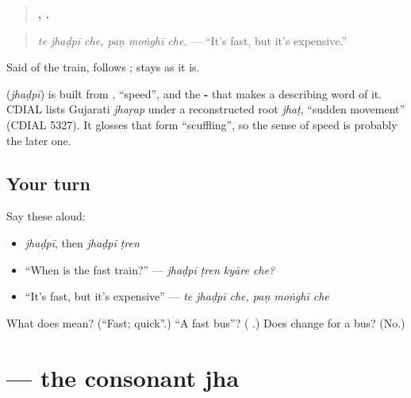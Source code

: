 \begin{quote}
\textbf{  ,   .}
\end{quote}

\begin{quote}
\emph{te jhaḍpī che, paṇ moṅghī che.} — \textquotedblleft{}It's fast, but it's expensive.\textquotedblright{}
\end{quote}

Said of the train, \textbf{} follows \textbf{}; \textbf{} stays as it is.

\begin{cousinweb}
\textbf{} (\emph{jhaḍpī}) is built from \textbf{}, \textquotedblleft{}speed\textquotedblright{}, and the \textbf{-} that makes a describing word of it. CDIAL lists Gujarati \emph{jhaṛap} under a reconstructed root \emph{jhaṭ}, \textquotedblleft{}sudden movement\textquotedblright{} (CDIAL 5327). It glosses that form \textquotedblleft{}scuffling\textquotedblright{}, so the sense of speed is probably the later one.
\end{cousinweb}

\subsection*{Your turn}
Say these aloud:

\begin{itemize}
\raggedright
  \item \emph{jhaḍpī}, then \emph{jhaḍpī ṭren}
  \item \textquotedblleft{}When is the fast train?\textquotedblright{} — \emph{jhaḍpī ṭren kyāre che?}
  \item \textquotedblleft{}It's fast, but it's expensive\textquotedblright{} — \emph{te jhaḍpī che, paṇ moṅghī che}
\end{itemize}

\begin{tcolorbox}[breakable,colback=teal!4,colframe=teal!35!black,title={Before you move on}]
What does \textbf{} mean? (\textquotedblleft{}Fast; quick\textquotedblright{}.) \textquotedblleft{}A fast bus\textquotedblright{}? (\textbf{ }.) Does \textbf{} change for a bus? (No.)
\end{tcolorbox}
\section[\texorpdfstring{\gu{ઝ} (jha)}{ઝ (jha)}]{ — the consonant jha}


